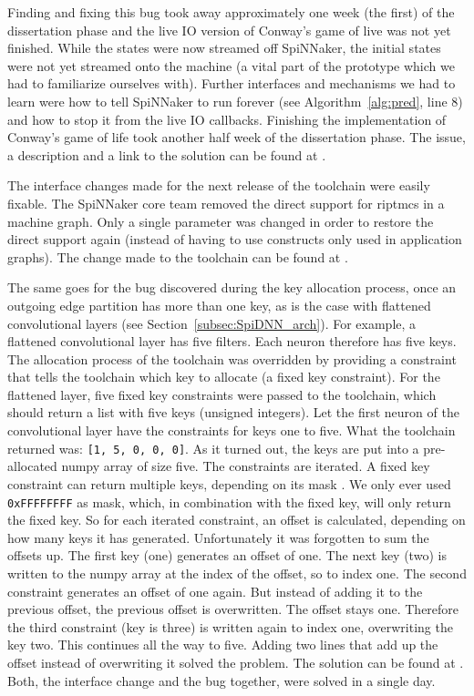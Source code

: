 \documentclass[]{article}
\begin{document}
Finding and fixing this bug took away approximately one week
(the first) of the dissertation phase and the live IO version of
Conway's game of live was not yet finished.
While the states were now streamed off SpiNNaker, the initial
states were not yet streamed onto the machine (a vital part of the
prototype which we had to familiarize ourselves with).
Further interfaces and mechanisms we had to learn were how to
tell SpiNNaker to run forever (see Algorithm~\ref{alg:pred}, line 8)
and how to stop it from the live IO callbacks.
Finishing the implementation of Conway's game of life took another
half week of the dissertation phase.
The issue, a description and a link to the solution can be found at
\citep{fassbender_2020a}.

The interface changes made for the next release of the toolchain
were easily fixable.
The SpiNNaker core team removed the direct support for \acrshort{riptmcs}
in a machine graph.
Only a single parameter was changed in order to restore the direct
support again (instead of having to use constructs only used in
application graphs).
The change made to the toolchain can be found at
\citet{fassbender_2020b}.

The same goes for the bug discovered during the key allocation
process, once an outgoing edge partition has more than one key,
as is the case with flattened convolutional layers (see
Section~\ref{subsec:SpiDNN_arch}).
For example, a flattened convolutional layer has five filters.
Each neuron therefore has five keys.
The allocation process of the toolchain was overridden by providing
a constraint that tells the toolchain which key to allocate
(a fixed key constraint).
For the flattened layer, five fixed key constraints were passed to
the toolchain, which should return a list with five keys (unsigned
integers).
Let the first neuron of the convolutional layer have the constraints
for keys one to five.
What the toolchain returned was: \texttt{[1, 5, 0, 0, 0]}.
As it turned out, the keys are put into a pre-allocated numpy
array \citep{van_der_walt_2011} of size five.
The constraints are iterated.
A fixed key constraint can return multiple keys, depending on its
mask \citep{furber_et_al_2020}.
We only ever used \texttt{0xFFFFFFFF} as mask, which, in combination
with the fixed key, will only return the fixed key.
So for each iterated constraint, an offset is calculated, depending
on how many keys it has generated.
Unfortunately it was forgotten to sum the offsets up.
The first key (one) generates an offset of one.
The next key (two) is written to the numpy array at the index of
the offset, so to index one.
The second constraint generates an offset of one again.
But instead of adding it to the previous offset, the previous offset
is overwritten.
The offset stays one.
Therefore the third constraint (key is three) is written again to
index one, overwriting the key two.
This continues all the way to five.
Adding two lines that add up the offset instead of overwriting it
solved the problem.
The solution can be found at \citet{fassbender_2020c}.
Both, the interface change and the bug together, were solved in
a single day.
\end{document}
